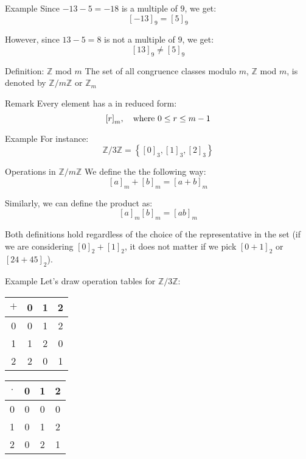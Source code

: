 \documentclass[a4paper]{article}
\begin{document}
\begin{parag}{Example}
    Since $-13 - 5 = -18$ is a multiple of $9$, we get: 
    \[\left[-13\right]_9 = \left[5\right]_9\]
    
    However, since $13 - 5 = 8$ is not a multiple of $9$, we get: 
    \[\left[13\right]_9 \neq \left[5\right]_9\]
\end{parag}

\begin{parag}{Definition: $\mathbb{Z}$ mod $m$}
    The set of all congruence classes modulo $m$, $\mathbb{Z}$ mod $m$, is denoted by $\mathbb{Z} / m\mathbb{Z}$ or $\mathbb{Z}_m$

    \begin{subparag}{Remark}
        Every element has a  in reduced form: 
        \[\left[r\right]_m, \mathspace \text{where } 0 \leq r \leq m-1\]
    \end{subparag}
    
    
    \begin{subparag}{Example}
        For instance: 
        \[\mathbb{Z} / 3\mathbb{Z} = \left\{\left[0\right]_3, \left[1\right]_3, \left[2\right]_3\right\}\]
    \end{subparag}
\end{parag}

\begin{parag}{Operations in $\mathbb{Z} / m\mathbb{Z}$}
    We define the  the following way:
    \[\left[a\right]_m + \left[b\right]_m = \left[a + b\right]_m\]
    
    Similarly, we can define the product as: 
    \[\left[a\right]_m \left[b\right]_m = \left[ab\right]_m\]
    
    Both definitions hold regardless of the choice of the representative in the set (if we are considering $\left[0\right]_2 + \left[1\right]_2$, it does not matter if we pick $\left[0 + 1\right]_2$ or $\left[24 + 45\right]_2$). 

    \begin{subparag}{Example}
        Let's draw operation tables for $\mathbb{Z} / 3 \mathbb{Z}$:
        \begin{center}
        \begin{tabular}{c|ccc}
            $+$ & 0 & 1 & 2 \\
            \hline
            0 & 0 & 1 & 2 \\
            1 & 1 & 2 & 0 \\
            2 & 2 & 0 & 1
        \end{tabular}
        \hspace{2em}
        \begin{tabular}{c|ccc}
            $\cdot$ & 0 & 1 & 2 \\
            \hline
            0 & 0 & 0 & 0 \\
            1 & 0 & 1 & 2 \\
            2 & 0 & 2 & 1
        \end{tabular}
        \end{center}
    \end{subparag}
\end{parag}
\end{document}
